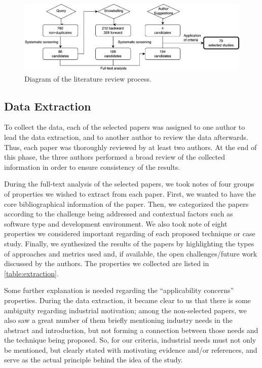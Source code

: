 \begin{figure}
  \center
  \includegraphics[width=0.8\linewidth]{figures/slr_tight.png}
  \caption{Diagram of the literature review process.}
  \label{fig:literature_review}
\end{figure}



\subsection{Data Extraction}
\label{subsec:extraction}


To collect the data, each of the selected papers was assigned to one author to lead the data extraction, and to another author to review the data afterwards.
Thus, each paper was thoroughly reviewed by at least two authors.
At the end of this phase, the three authors performed a broad review of the collected information in order to ensure consistency of the results.

During the full-text analysis of the selected papers, we took notes of four groups of properties we wished to extract from each paper.
First, we wanted to have the core bibliographical information of the paper.
Then, we categorized the papers according to the \rt challenge being addressed and contextual factors such as software type and development environment.
We also took note of eight properties we considered important regarding \rea of each proposed technique or case study.
Finally, we synthesized the results of the papers by highlighting the types of approaches and metrics used and, if available, the open challenges/future work discussed by the authors.
The properties we collected are listed in \autoref{table:extraction}.

Some further explanation is needed regarding the ``applicability concerns'' properties.
During the data extraction, it became clear to us that there is some ambiguity regarding industrial motivation; among the non-selected papers, we also saw a great number of them briefly mentioning industry needs in the abstract and introduction, but not forming a connection between those needs and the technique being proposed.
So, for our criteria, industrial needs must not only be mentioned, but clearly stated with motivating evidence and/or references, and serve as the actual principle behind the idea of the study.

